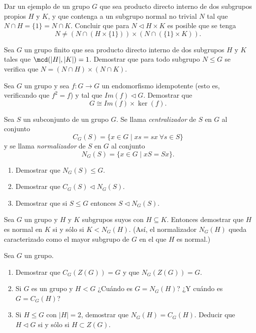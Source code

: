\begin{ejercicio}
    Dar un ejemplo de un grupo $G$ que sea producto directo interno de dos subgrupos propios $H$ y $K$, y que contenga a un subgrupo normal no trivial $N$ tal que $N\cap H=\{1\}=N\cap K$. Concluir que para $N\lhd H\times K$ es posible que se tenga
    \[
        N\neq (N\cap (H\times \{1\}))\times (N\cap (\{1\}\times K)).
    \]
\end{ejercicio}

\begin{ejercicio}
    Sea $G$ un grupo finito que sea producto directo interno de dos subgrupos $H$ y $K$ tales que $\mcd(|H|,|K|)=1$. Demostrar que para todo subgrupo $N\leq G$ se verifica que $N=(N\cap H)\times (N\cap K)$.
\end{ejercicio}

\begin{ejercicio}
    Sea $G$ un grupo y sea $f:G\to G$ un endomorfismo idempotente (esto es, verificando que $f^2=f$) y tal que $Im(f)\lhd G$. Demostrar que
    \[
        G\cong Im(f)\times \ker(f).
    \]
\end{ejercicio}

\begin{ejercicio}
    Sea $S$ un subconjunto de un grupo $G$. Se llama \emph{centralizador} de $S$ en $G$ al conjunto
    \[
        C_G(S) = \{x\in G\mid xs=sx\ \forall s\in S\}
    \]
    y se llama \emph{normalizador} de $S$ en $G$ al conjunto
    \[
        N_G(S) = \{x\in G\mid xS=Sx\}.
    \]
    \begin{enumerate}
        \item Demostrar que $N_G(S)\leq G$.
        \item Demostrar que $C_G(S)\lhd N_G(S)$.
        \item Demostrar que si $S\leq G$ entonces $S\lhd N_G(S)$.
    \end{enumerate}
\end{ejercicio}

\begin{ejercicio}
    Sea $G$ un grupo y $H$ y $K$ subgrupos suyos con $H\subseteq K$. Entonces demostrar que $H$ es normal en $K$ si y sólo si $K< N_G(H)$. (Así, el normalizador $N_G(H)$ queda caracterizado como el mayor subgrupo de $G$ en el que $H$ es normal.)
\end{ejercicio}

\begin{ejercicio} Sea $G$ un grupo.
    \begin{enumerate}
        \item Demostrar que $C_G(Z(G))=G$ y que $N_G(Z(G))=G$.
        \item Si $G$ es un grupo y $H<G$ ¿Cuándo es $G=N_G(H)$? ¿Y cuándo es $G=C_G(H)$?
        \item Si $H\leq G$ con $|H|=2$, demostrar que $N_G(H)=C_G(H)$. Deducir que $H\lhd G$ si y sólo si $H\subset Z(G)$.
    \end{enumerate}
\end{ejercicio}

